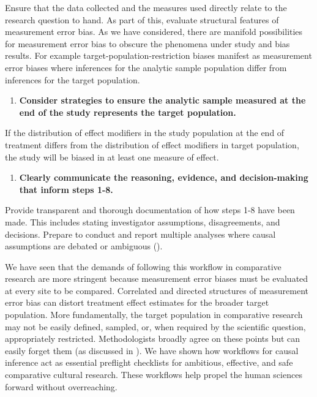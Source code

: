 \documentclass[
  single column]{article}
\providecommand{\tightlist}{%
  \setlength{\itemsep}{0pt}\setlength{\parskip}{0pt}}\usepackage{longtable,booktabs,array}
\begin{document}
Ensure that the data collected and the measures used directly relate to
the research question to hand. As part of this, evaluate structural
features of measurement error bias. As we have considered, there are
manifold possibilities for measurement error bias to obscure the
phenomena under study and bias results. For example
target-population-restriction biases manifest as measurement error
biases where inferences for the analytic sample population differ from
inferences for the target population.

\begin{enumerate}
\def\labelenumi{\arabic{enumi}.}
\setcounter{enumi}{7}
\tightlist
\item
  \textbf{Consider strategies to ensure the analytic sample measured at
  the end of the study represents the target population.}
\end{enumerate}

If the distribution of effect modifiers in the study population at the
end of treatment differs from the distribution of effect modifiers in
target population, the study will be biased in at least one measure of
effect.

\begin{enumerate}
\def\labelenumi{\arabic{enumi}.}
\setcounter{enumi}{8}
\tightlist
\item
  \textbf{Clearly communicate the reasoning, evidence, and
  decision-making that inform steps 1-8.}
\end{enumerate}

Provide transparent and thorough documentation of how steps 1-8 have
been made. This includes stating investigator assumptions,
disagreements, and decisions. Prepare to conduct and report multiple
analyses where causal assumptions are debated or ambiguous
().

We have seen that the demands of following this workflow in comparative
research are more stringent because measurement error biases must be
evaluated at every site to be compared. Correlated and directed
structures of measurement error bias can distort treatment effect
estimates for the broader target population. More fundamentally, the
target population in comparative research may not be easily defined,
sampled, or, when required by the scientific question, appropriately
restricted. Methodologists broadly agree on these points but can easily
forget them (as discussed in ). We have shown how workflows for causal inference act as
essential preflight checklists for ambitious, effective, and safe
comparative cultural research. These workflows help propel the human
sciences forward without overreaching.
\end{document}
